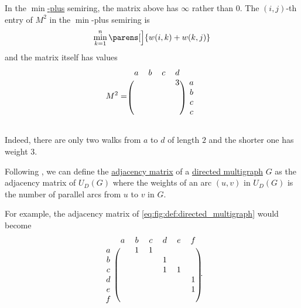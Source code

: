 \begin{example}
\begin{thmenum}
    In the \hyperref[def:tropical_semiring]{\( \min \)-plus} semiring, the matrix above has \( \infty \) rather than \( 0 \). The \( (i, j) \)-th entry of \( M^2 \) in the \( \min \)-plus semiring is
    \begin{equation*}
      \min_{k=1}^n \parens[\Big]{ w(i,k) + w(k,j) }
    \end{equation*}
    and the matrix itself has values
    \begin{equation*}
      M^2 =
      \begin{blockarray}{ccccc}
        a & b & c & d & \\
      \begin{block}{(cccc)c}
          &   &   & 3 & a \\
          &   &   &   & b \\
          &   &   &   & c \\
          &   &   &   & c \\
      \end{block}
      \end{blockarray}
    \end{equation*}

    Indeed, there are only two walks from \( a \) to \( d \) of length \( 2 \) and the shorter one has weight \( 3 \).

     Following , we can define the \hyperref[def:graph_adjacency_matrix]{adjacency matrix} of a \hyperref[def:directed_multigraph]{directed multigraph} \( G \) as the adjacency matrix of \hyperref[def:graph_functors/directed_forgetful]{\( U_D \)}\( (G) \) where the weights of an arc \( (u, v) \) in \( U_D(G) \) is the number of parallel arcs from \( u \) to \( v \) in \( G \).

    For example, the adjacency matrix of \eqref{eq:fig:def:directed_multigraph} would become
    \begin{equation}\label{eq:ex:def:graph_adjacency_matrix/multi}
      \begin{blockarray}{cccccccc}
          & a        & b        & c        & d        & e        & f \\
      \begin{block}{c(ccccccc)}
        a &          & 1        & 1        &          &          &   \\
        b &          &          &          & 1        &          &   \\
        c &          &          &          & 1        & 1        &   \\
        d &          &          &          &          &          & 1 \\
        e &          &          &          &          &          & 1 \\
        f &          &          &          &          &          &   \\
      \end{block}
      \end{blockarray}.
    \end{equation}
  \end{thmenum}
\end{example}

